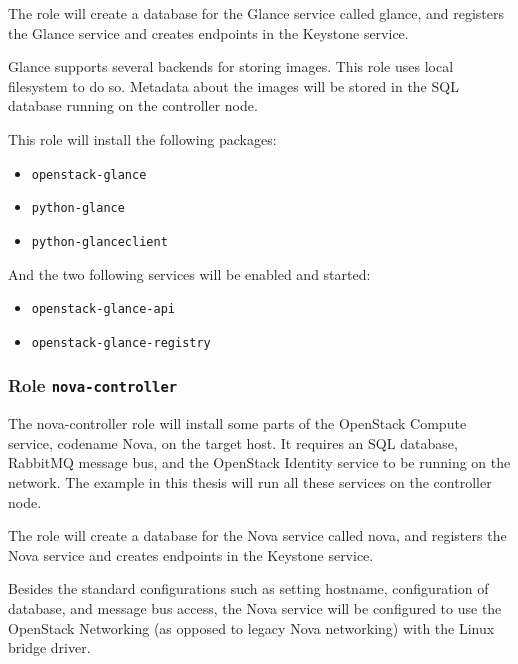 The role will create a database for the Glance service called glance, and registers the Glance service and creates endpoints in the Keystone service.

Glance supports several backends for storing images. This role uses local filesystem to do so. Metadata about the images will be stored in the SQL database running on the controller node.

This role will install the following packages:
\begin{itemize}
  \item{\texttt{openstack-glance}}
  \item{\texttt{python-glance}}
  \item{\texttt{python-glanceclient}}
\end{itemize}
And the two following services will be enabled and started:
\begin{itemize}
  \item{\texttt{openstack-glance-api}}
  \item{\texttt{openstack-glance-registry}}
\end{itemize}


\subsubsection*{Role \texttt{nova-controller}}
The nova-controller role will install some parts of the OpenStack Compute service, codename Nova, on the target host. It requires an SQL database, RabbitMQ message bus, and the OpenStack Identity service to be running on the network. The example in this thesis will run all these services on the controller node.

The role will create a database for the Nova service called nova, and registers the Nova service and creates endpoints in the Keystone service.

Besides the standard configurations such as setting hostname, configuration of database, and message bus access, the Nova service will be configured to use the OpenStack Networking (as opposed to legacy Nova networking) with the Linux bridge driver.

